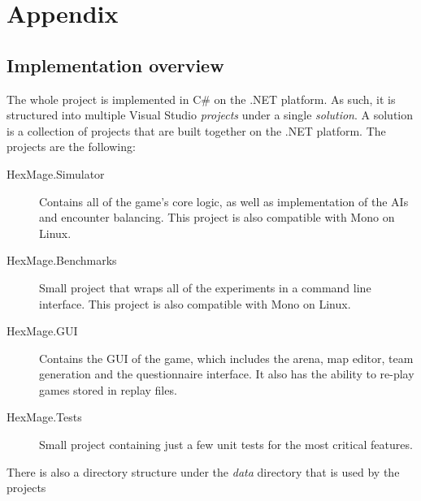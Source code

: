\chapter{Appendix}
\label{appendix}

\section{Implementation overview}

The whole project is implemented in C\# on the .NET platform. As such, it is structured
into multiple Visual Studio \emph{projects} under a single \emph{solution}. A solution is a collection
of projects that are built together on the .NET platform. The projects are
the following:


\begin{description}
	\item[HexMage.Simulator] Contains all of the game's core logic, as well as implementation of the AIs
		and encounter balancing. This project is also compatible with Mono on Linux.
	\item[HexMage.Benchmarks] Small project that wraps all of the experiments in a command line interface.
		This project is also compatible with Mono on Linux.
	\item[HexMage.GUI] Contains the GUI of the game, which includes the arena, map editor, team generation
		and the questionnaire interface. It also has the ability to re-play games stored in replay files.
	\item[HexMage.Tests] Small project containing just a few unit tests for the most critical features.
\end{description}

There is also a directory structure under the \emph{data} directory that is used by the projects

